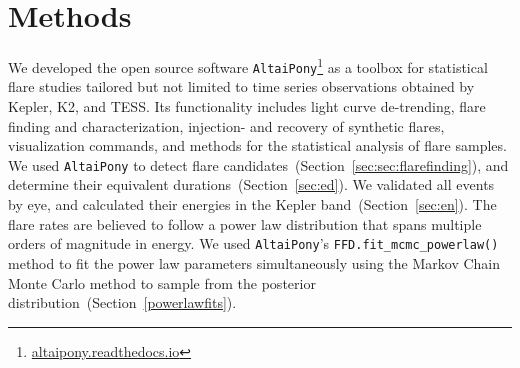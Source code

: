 \documentclass{aa}
\begin{document}
\section{Methods}
\label{sec:methods}
We developed the open source software \texttt{AltaiPony}\footnote{\url{altaipony.readthedocs.io}} as a toolbox for statistical flare studies tailored but not limited to time series observations obtained by Kepler, K2, and TESS. Its functionality includes light curve de-trending, flare finding and characterization, injection- and recovery of synthetic flares, visualization commands, and methods for the statistical analysis of flare samples. We used \texttt{AltaiPony} to detect flare candidates~(Section~\ref{sec:sec:flarefinding}), and determine their equivalent durations~(Section~\ref{sec:ed}). We validated all events by eye, and calculated their energies in the Kepler band~(Section~\ref{sec:en}). The flare rates are believed to follow a power law distribution that spans multiple orders of magnitude in energy. We used \texttt{AltaiPony}'s \texttt{FFD.fit\_mcmc\_powerlaw()} method to fit the power law parameters simultaneously using the Markov Chain Monte Carlo method to sample from the posterior distribution~(Section~\ref{powerlawfits}).
\end{document}
